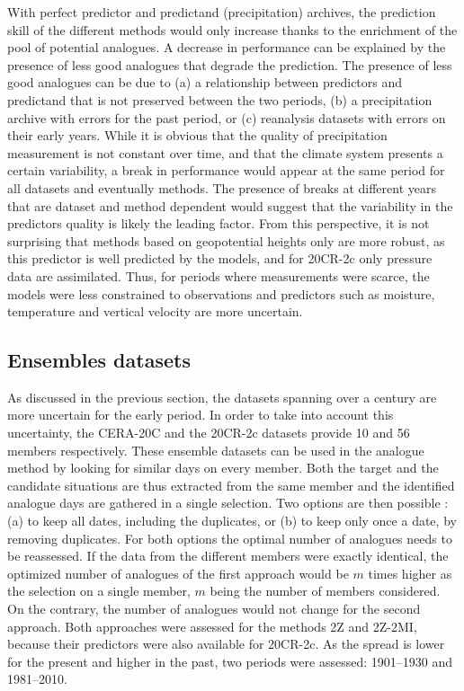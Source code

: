 \documentclass{ametsoc}
\begin{document}
With perfect predictor and predictand (precipitation) archives, the prediction skill of the different methods would only increase thanks to the enrichment of the pool of potential analogues. A decrease in performance can be explained by the presence of less good analogues that degrade the prediction. The presence of less good analogues can be due to (a) a relationship between predictors and predictand that is not preserved between the two periods, (b) a precipitation archive with errors for the past period, or (c) reanalysis datasets with errors on their early years. While it is obvious that the quality of precipitation measurement is not constant over time, and that the climate system presents a certain variability, a break in performance would appear at the same period for all datasets and eventually methods. The presence of breaks at different years that are dataset and method dependent would suggest that the variability in the predictors quality is likely the leading factor. From this perspective, it is not surprising that methods based on geopotential heights only are more robust, as this predictor is well predicted by the models, and for 20CR-2c only pressure data are assimilated. Thus, for periods where measurements were scarce, the models were less constrained to observations and predictors such as moisture, temperature and vertical velocity are more uncertain. 


\subsection{Ensembles datasets}
\label{sec:ensemble}

As discussed in the previous section, the datasets spanning over a century are more uncertain for the early period. In order to take into account this uncertainty, the CERA-20C and the 20CR-2c datasets provide 10 and 56 members respectively. These ensemble datasets can be used in the analogue method by looking for similar days on every member. Both the target and the candidate situations are thus extracted from the same member and the identified analogue days are gathered in a single selection. Two options are then possible : (a) to keep all dates, including the duplicates, or (b) to keep only once a date, by removing duplicates. For both options the optimal number of analogues needs to be reassessed. If the data from the different members were exactly identical, the optimized number of analogues of the first approach would be $m$ times higher as the selection on a single member, $m$ being the number of members considered. On the contrary, the number of analogues would not change for the second approach. Both approaches were assessed for the methods 2Z and 2Z-2MI, because their predictors were also available for 20CR-2c. As the spread is lower for the present and higher in the past, two periods were assessed: 1901--1930 and 1981--2010.
\end{document}
